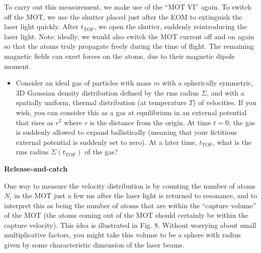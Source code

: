 \documentclass{../lab}
\begin{document}
To carry out this measurement, we make use of the ``MOT VI'' again. To switch off the MOT, we use the shutter placed just after the EOM to extinguish the laser light quickly. After $t_\text{TOF}$, we open the shutter, suddenly reintroducing the laser light. Note: ideally, we would also switch the MOT current off and on again so that the atoms truly propagate freely during the time of flight. The remaining magnetic fields can exert forces on the atoms, due to their magnetic dipole moment.

\begin{itemize}
    \item Consider an ideal gas of particles with mass $m$ with a spherically symmetric, 3D Gaussian density distribution defined by the rms radius $\Sigma$, and with a spatially uniform, thermal distribution (at temperature $T$) of velocities. If you wish, you can consider this as a gas at equilibrium in an external potential that rises as $r^2$ where $r$ is the distance from the origin. At time $t = 0$, the gas is suddenly allowed to expand ballistically (meaning that your fictitious external potential is suddenly set to zero). At a later time, $t_\text{TOF}$, what is the rms radius $\Sigma(t_\text{TOF})$ of the gas?
\end{itemize}

\textbf{Release-and-catch}

One way to measure the velocity distribution is by counting the number of atoms $N_i$ in the MOT just a few ms after the laser light is returned to resonance, and to interpret this as being the number of atoms that are within the ``capture volume'' of the MOT (the atoms coming out of the MOT should certainly be within the capture velocity). This idea is illustrated in Fig. 8. Without worrying about small multiplicative factors, you might take this volume to be a sphere with radius given by some characteristic dimension of the laser beams.
\end{document}
